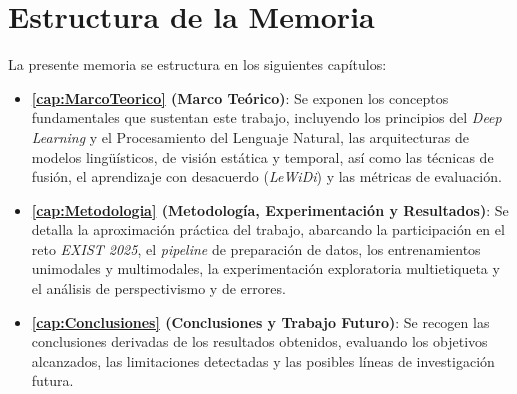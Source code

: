 \section{Estructura de la Memoria}
\label{sec:Estructura}
La presente memoria se estructura en los siguientes capítulos:
\begin{itemize}
    \item \textbf{\autoref{cap:MarcoTeorico} (Marco Teórico)}: Se exponen los conceptos fundamentales que sustentan este trabajo, incluyendo los principios del \textit{Deep Learning} y el Procesamiento del Lenguaje Natural, las arquitecturas de modelos lingüísticos, de visión estática y temporal, así como las técnicas de fusión, el aprendizaje con desacuerdo (\textit{LeWiDi}) y las métricas de evaluación. 
    \item \textbf{\autoref{cap:Metodologia} (Metodología, Experimentación y Resultados)}: Se detalla la aproximación práctica del trabajo, abarcando la participación en el reto \textit{EXIST 2025}, el \textit{pipeline} de preparación de datos, los entrenamientos unimodales y multimodales, la experimentación exploratoria multietiqueta y el análisis de perspectivismo y de errores. 
    \item \textbf{\autoref{cap:Conclusiones} (Conclusiones y Trabajo Futuro)}: Se recogen las conclusiones derivadas de los resultados obtenidos, evaluando los objetivos alcanzados, las limitaciones detectadas y las posibles líneas de investigación futura. 
\end{itemize}